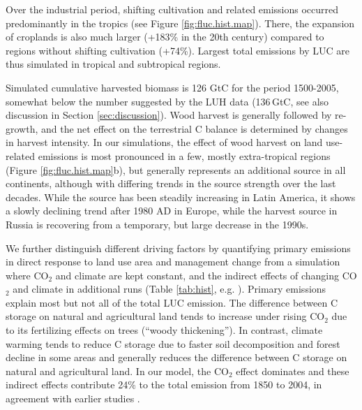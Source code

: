 Over the industrial period, shifting cultivation and related emissions occurred predominantly in the tropics (see Figure \ref{fig:fluc.hist.map}). There, the expansion of croplands is also much larger (+183\% in the 20th century) compared to regions without shifting cultivation (+74\%). Largest total emissions by LUC are thus simulated in tropical and subtropical regions.

Simulated cumulative harvested biomass is 126 GtC for the period 1500-2005, somewhat below the number suggested by the LUH data (136\,GtC, see also discussion in Section \ref{sec:discussion}). Wood harvest is generally followed by re-growth, and the net effect on the terrestrial C balance is determined by changes in harvest intensity. In our simulations, the effect of wood harvest on land use-related emissions is most pronounced in a few, mostly extra-tropical regions (Figure \ref{fig:fluc.hist.map}b), but generally represents an additional source in all continents, although with differing trends in the source strength over the last decades. While the source has been steadily increasing in Latin America, it shows a slowly declining trend  after 1980 AD in Europe, while the harvest source in Russia is recovering from a temporary, but large decrease in the 1990s.

We further distinguish different driving factors by quantifying primary emissions in direct response to land use area and management change from a simulation where CO$_2$ and climate are kept constant, and the indirect effects of changing CO$_2$ and climate in additional runs (Table \ref{tab:hist}, e.g. \citet{strassmann08tel}). Primary emissions explain most but not all of the total LUC emission. The difference between C storage on natural and agricultural land tends to increase under rising CO$_2$ due to its fertilizing effects on trees (``woody thickening''). In contrast, climate warming tends to reduce C storage due to faster soil decomposition and forest decline in some areas and generally reduces the difference between C storage on natural and agricultural land. In our model, the CO$_2$ effect dominates and these indirect effects contribute 24\% to the total emission from 1850 to 2004, in agreement with earlier studies \citep{strassmann08tel}.

